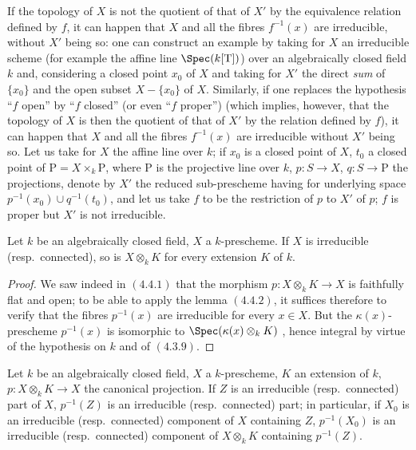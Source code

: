 \begin{remark}[4.4.3]
\label{IV.4.4.3}
If the topology of $X$ is not the quotient of that of $X'$ by the equivalence relation defined by $f$, it can happen that $X$ and all the fibres $f^{-1}(x)$ are irreducible, without $X'$ being so: one can construct an example by taking for $X$ an irreducible scheme (for example the affine line $\Spec(k[\mathrm{T}])$) over an algebraically closed field $k$ and, considering a closed point $x_0$ of $X$ and taking for $X'$ the direct \emph{sum} of $\{x_0\}$ and the open subset $X-\{x_0\}$ of $X$.
Similarly, if one replaces the hypothesis ``$f$ open'' by ``$f$ closed'' (or even ``$f$ proper'') (which implies, however, that the topology of $X$ is then the quotient of that of $X'$ by the relation defined by $f$), it can happen that $X$ and all the fibres $f^{-1}(x)$ are irreducible without $X'$ being so.
Let us take for $X$ the affine line over $k$; if $x_0$ is a closed point of $X$, $t_0$ a closed point of $\mathrm{P}=X\times_k\mathrm{P}$, where $\mathrm{P}$ is the projective line over $k$, $p:S\to X$, $q:S\to\mathrm{P}$ the projections, denote by $X'$ the reduced sub-prescheme having for underlying space $p^{-1}(x_0)\cup q^{-1}(t_0)$, and let us take $f$ to be the restriction of $p$ to $X'$ of $p$; $f$ is proper but $X'$ is not irreducible.
\end{remark}

\begin{theorem}[4.4.4]
\label{IV.4.4.4}
Let $k$ be an algebraically closed field, $X$ a $k$-prescheme.
If $X$ is irreducible (resp.\ connected), so is $X\otimes_k K$ for every extension $K$ of $k$.
\end{theorem}

\begin{proof}
We saw indeed in $(4.4.1)$ that the morphism $p:X\otimes_k K\to X$ is faithfully flat and open; to be able to apply the lemma $(4.4.2)$, it suffices therefore to verify that the fibres $p^{-1}(x)$ are irreducible for every $x\in X$.
But the $\kappa(x)$-prescheme $p^{-1}(x)$ is isomorphic to $\Spec(\kappa(x)\otimes_k K)$ , hence integral by virtue of the hypothesis on $k$ and of $(4.3.9)$.
\end{proof}

\begin{corollary}[4.4.5]
\label{IV.4.4.5}
Let $k$ be an algebraically closed field, $X$ a $k$-prescheme, $K$ an extension of $k$, $p:X\otimes_k K\to X$ the canonical projection.
If $Z$ is an irreducible (resp.\ connected) part of $X$, $p^{-1}(Z)$ is an irreducible (resp.\ connected) part; in particular, if $X_0$ is an irreducible (resp.\ connected) component of $X$ containing $Z$, $p^{-1}(X_0)$ is an irreducible (resp.\ connected) component of $X\otimes_k K$ containing $p^{-1}(Z)$.
\end{corollary}

